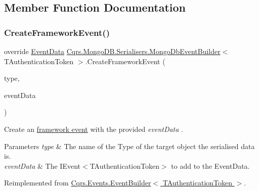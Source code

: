 \subsection{Member Function Documentation}
\mbox{\label{classCqrs_1_1MongoDB_1_1Serialisers_1_1MongoDbEventBuilder_a06afbb994fd3f679f275dea3d1d60c6e_a06afbb994fd3f679f275dea3d1d60c6e}} 
\subsubsection{\texorpdfstring{Create\+Framework\+Event()}{CreateFrameworkEvent()}}
{\footnotesize\ttfamily override \hyperlink{classCqrs_1_1Events_1_1EventData}{Event\+Data} \hyperlink{classCqrs_1_1MongoDB_1_1Serialisers_1_1MongoDbEventBuilder}{Cqrs.\+Mongo\+D\+B.\+Serialisers.\+Mongo\+Db\+Event\+Builder}$<$ T\+Authentication\+Token $>$.Create\+Framework\+Event (\begin{DoxyParamCaption}\item[{string}]{type,  }\item[{\hyperlink{interfaceCqrs_1_1Events_1_1IEvent}{I\+Event}$<$ T\+Authentication\+Token $>$}]{event\+Data }\end{DoxyParamCaption})\hspace{0.3cm}{\ttfamily [virtual]}}



Create an \hyperlink{}{framework event} with the provided {\itshape event\+Data} . 


\begin{DoxyParams}{Parameters}
{\em type} & The name of the Type of the target object the serialised data is.\\
\hline
{\em event\+Data} & The I\+Event$<$\+T\+Authentication\+Token$>$ to add to the Event\+Data.\\
\hline
\end{DoxyParams}


Reimplemented from \hyperlink{classCqrs_1_1Events_1_1EventBuilder_aa6a794ef27f2795802a4390fd16535f6_aa6a794ef27f2795802a4390fd16535f6}{Cqrs.\+Events.\+Event\+Builder$<$ T\+Authentication\+Token $>$}.

